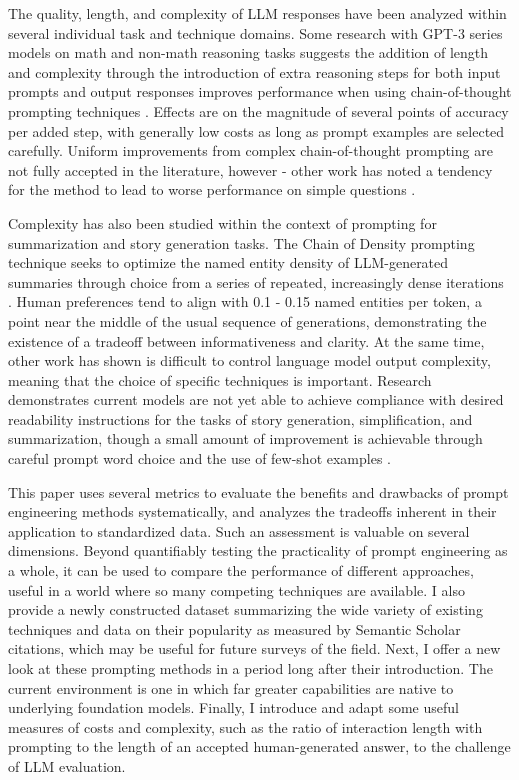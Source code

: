 \documentclass[11pt]{article}
\begin{document}
The quality, length, and complexity of LLM responses have been analyzed within several individual task and technique domains. Some research with GPT-3 series models on math and non-math reasoning tasks suggests the addition of length and complexity through the introduction of extra reasoning steps for both input prompts and output responses improves performance when using chain-of-thought prompting techniques \cite{fu_complexity-based_2023}. Effects are on the magnitude of several points of accuracy per added step, with generally low costs as long as prompt examples are selected carefully. Uniform improvements from complex chain-of-thought prompting are not fully accepted in the literature, however - other work has noted a tendency for the method to lead to worse performance on simple questions \cite{shum_automatic_2023}.

Complexity has also been studied within the context of prompting for summarization and story generation tasks. The Chain of Density prompting technique seeks to optimize the named entity density of LLM-generated summaries through choice from a series of repeated, increasingly dense iterations \cite{adams_sparse_2023}. Human preferences tend to align with 0.1 - 0.15 named entities per token, a point near the middle of the usual sequence of generations, demonstrating the existence of a tradeoff between informativeness and clarity. At the same time, other work has shown is difficult to control language model output complexity, meaning that the choice of specific techniques is important. Research demonstrates current models are not yet able to achieve compliance with desired readability instructions for the tasks of story generation, simplification, and summarization, though a small amount of improvement is achievable through careful prompt word choice and the use of few-shot examples \cite{pu_chatgpt_2023, imperial_flesch_2023}.

This paper uses several metrics to evaluate the benefits and drawbacks of prompt engineering methods systematically, and analyzes the tradeoffs inherent in their application to standardized data. Such an assessment is valuable on several dimensions. Beyond quantifiably testing the practicality of prompt engineering as a whole, it can be used to compare the performance of different approaches, useful in a world where so many competing techniques are available. I also provide a newly constructed dataset summarizing the wide variety of existing techniques and data on their popularity as measured by Semantic Scholar citations, which may be useful for future surveys of the field. Next, I offer a new look at these prompting methods in a period long after their introduction. The current environment is one in which far greater capabilities are native to underlying foundation models. Finally, I introduce and adapt some useful measures of costs and complexity, such as the ratio of interaction length with prompting to the length of an accepted human-generated answer, to the challenge of LLM evaluation.
\end{document}
